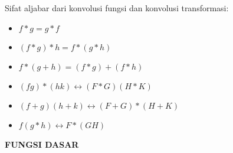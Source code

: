\documentclass{article}
\begin{document}
Sifat aljabar dari konvolusi fungsi dan konvolusi transformasi:
\begin{itemize}
    \item $f*g = g*f$
    \item $(f*g)*h = f*(g*h)$
    \item $f*(g+h) = (f*g)+(f*h)$
    \item $(fg)*(hk) \leftrightarrow (F*G)(H*K)$
    \item $(f+g)(h+k) \leftrightarrow (F+G)*(H+K)$
    \item $f(g*h) \leftrightarrow F*(GH)$
\end{itemize}



\newpage
\begin{center}
    \textbf{FUNGSI DASAR}
\end{center}
\leavevmode\\
\end{document}
